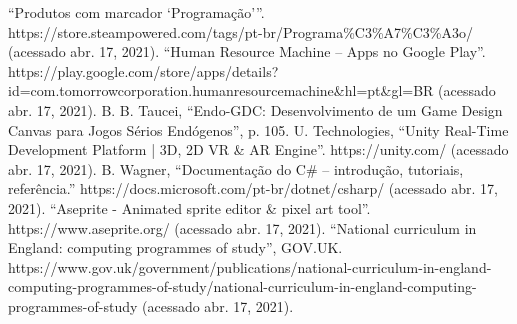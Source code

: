 \documentclass[conference]{IEEEtran}
\begin{document}
\begin{thebibliography}{23}
 “Produtos com marcador ‘Programação’”. https://store.steampowered.com/tags/pt-br/Programa\%C3\%A7\%C3\%A3o/ (acessado abr. 17, 2021).
 “Human Resource Machine – Apps no Google Play”. https://play.google.com/store/apps/details?id=com.tomorrowcorporation.\linebreak humanresourcemachine\&hl=pt\&gl=BR (acessado abr. 17, 2021).
 B. B. Taucei, “Endo-GDC: Desenvolvimento de um Game Design Canvas para Jogos Sérios Endógenos”, p. 105.
 U. Technologies, “Unity Real-Time Development Platform | 3D, 2D VR \& AR Engine”. https://unity.com/ (acessado abr. 17, 2021).
 B. Wagner, “Documentação do C\# – introdução, tutoriais, referência.” https://docs.microsoft.com/pt-br/dotnet/csharp/ (acessado abr. 17, 2021).
 “Aseprite - Animated sprite editor \& pixel art tool”. https://www.aseprite.org/ (acessado abr. 17, 2021).
 “National curriculum in England: computing programmes of study”, GOV.UK. https://www.gov.uk/government/publications/national-curriculum-in-england-computing-programmes-of-study/national-curriculum-in-england-computing-programmes-of-study (acessado abr. 17, 2021).

\end{thebibliography}
\end{document}
